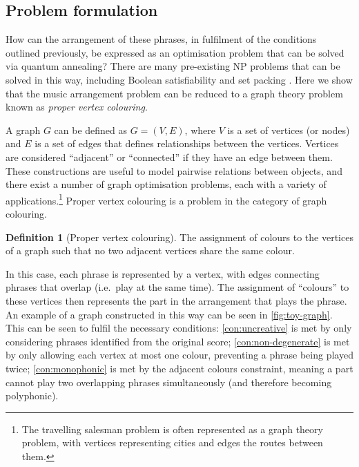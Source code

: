\documentclass[12pt]{article}
\theoremstyle{definition}
\newtheorem*{definition}{Definition}
\begin{document}
\subsection{Problem formulation}

How can the arrangement of these phrases, in fulfilment of the conditions outlined previously, be expressed as an optimisation problem that can be solved via quantum annealing? There are many pre-existing NP problems that can be solved in this way, including Boolean satisfiability and set packing \cite{lucas_ising_2014}. Here we show that the music arrangement problem can be reduced to a graph theory problem known as \emph{proper vertex colouring}.

A graph $G$ can be defined as $G=(V,E)$, where $V$ is a set of vertices (or nodes) and $E$ is a set of edges that defines relationships between the vertices. Vertices are considered ``adjacent'' or ``connected'' if they have an edge between them. These constructions are useful to model pairwise relations between objects, and there exist a number of graph optimisation problems, each with a variety of applications.\footnote{The travelling salesman problem is often represented as a graph theory problem, with vertices representing cities and edges the routes between them.} Proper vertex colouring is a problem in the category of graph colouring.

\begin{definition}[Proper vertex colouring]
    The assignment of colours to the vertices of a graph such that no two adjacent vertices share the same colour.
\end{definition}

In this case, each phrase is represented by a vertex, with edges connecting phrases that overlap (i.e.\ play at the same time). The assignment of ``colours'' to these vertices then represents the part in the arrangement that plays the phrase. An example of a graph constructed in this way can be seen in \cref{fig:toy-graph}. This can be seen to fulfil the necessary conditions: \cref{con:uncreative} is met by only considering phrases identified from the original score; \cref{con:non-degenerate} is met by only allowing each vertex at most one colour, preventing a phrase being played twice; \cref{con:monophonic} is met by the adjacent colours constraint, meaning a part cannot play two overlapping phrases simultaneously (and therefore becoming polyphonic). 
\end{document}
